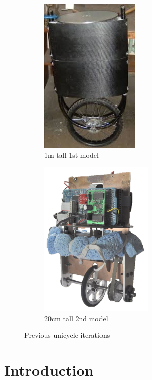 \documentclass[twoside,twocolumn,12pt]{article}
\begin{document}
\begin{figure}[b!]
  \centering
  \begin{subfigure}[t]{0.325\textwidth}
    \includegraphics[width=\linewidth,height=7.5cm]{first}
   \caption{1m tall 1st model \cite{roderigo}}
  \label{sub:old1}
  \end{subfigure}
  \begin{subfigure}[t]{0.325\textwidth}
    \includegraphics[width=\linewidth,height=7.5cm]{old_unicycle}
    \caption{20cm tall 2nd model \cite{eric}}
  \label{sub:old2}
  \end{subfigure}
  \caption{Previous unicycle iterations}
  \label{fig:unimodels}
\end{figure}
\section{Introduction}
\end{document}
